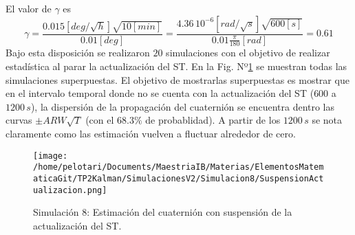 \documentclass[a4paper,11pt,twoside]{IT-CNEA}
\begin{document}
El valor de $\gamma$ es
\begin{equation}
\gamma=\frac{0.015\left[deg/\sqrt{h}\right]\sqrt{10\left[min\right]}}{0.01\left[deg\right]}=\frac{4.36\,10^{-6}\left[rad/\sqrt{s}\right]\sqrt{600\left[s\right]}}{0.01\frac{\pi}{180}\left[rad\right]}=	0.61
\end{equation}
Bajo esta disposición se realizaron $20$ simulaciones con el objetivo de realizar estadística al parar la actualización del ST. En la Fig. Nº\ref{fig:Simulacion8/SuspensionActualizacion} se muestran todas las simulaciones superpuestas. El objetivo de mostrarlas superpuestas es mostrar que en el intervalo temporal donde no se cuenta con la actualización del ST ($600$ a $1200\,s$), la dispersión de la propagación del cuaternión se encuentra dentro las curvas $\pm ARW\sqrt{T}$ (con el $68.3\%$ de probablidad). A partir de los $1200\,s$ se nota claramente como las estimación vuelven a fluctuar alrededor de cero. 
\begin{figure}[h!]
\centering
\texttt{[image: /home/pelotari/Documents/MaestriaIB/Materias/ElementosMatematicaGit/TP2Kalman/SimulacionesV2/Simulacion8/SuspensionActualizacion.png]}
\caption{Simulación 8: Estimación del cuaternión con suspensión de la actualización del ST.}
\label{fig:Simulacion8/SuspensionActualizacion}
\end{figure}
\end{document}
